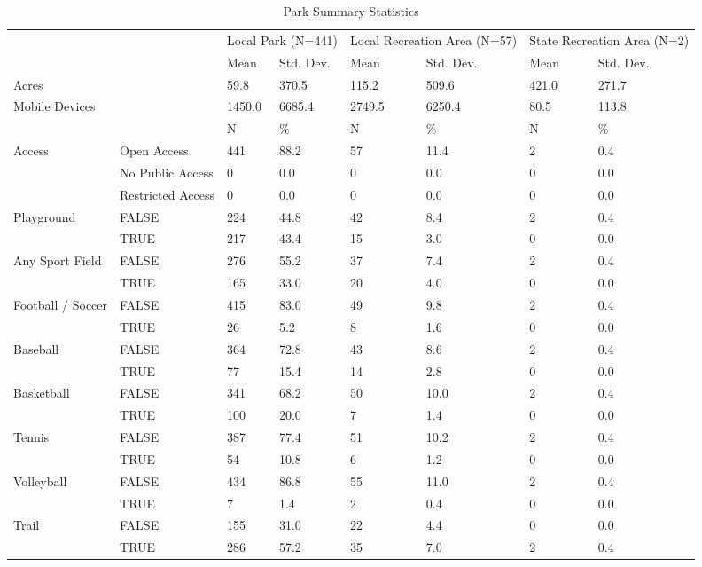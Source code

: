 \documentclass[]{elsarticle} %
\begin{document}
\begin{table}

\caption{\label{tab:park-attributes}Park Summary Statistics}
\centering
\begin{tabular}[t]{llllllll}
\toprule
\multicolumn{2}{c}{ } & \multicolumn{2}{c}{Local Park (N=441)} & \multicolumn{2}{c}{Local Recreation Area (N=57)} & \multicolumn{2}{c}{State Recreation Area (N=2)} \\
\cmidrule(l{3pt}r{3pt}){3-4} \cmidrule(l{3pt}r{3pt}){5-6} \cmidrule(l{3pt}r{3pt}){7-8}
  &    & Mean & Std. Dev. & Mean  & Std. Dev.  & Mean   & Std. Dev.  \\
\midrule
Acres &  & 59.8 & 370.5 & 115.2 & 509.6 & 421.0 & 271.7\\
Mobile Devices &  & 1450.0 & 6685.4 & 2749.5 & 6250.4 & 80.5 & 113.8\\
\midrule
 &  & N & \% & N & \% & N & \%\\
Access & Open Access & 441 & 88.2 & 57 & 11.4 & 2 & 0.4\\
 & No Public Access & 0 & 0.0 & 0 & 0.0 & 0 & 0.0\\
 & Restricted Access & 0 & 0.0 & 0 & 0.0 & 0 & 0.0\\
Playground & FALSE & 224 & 44.8 & 42 & 8.4 & 2 & 0.4\\
 & TRUE & 217 & 43.4 & 15 & 3.0 & 0 & 0.0\\
Any Sport Field & FALSE & 276 & 55.2 & 37 & 7.4 & 2 & 0.4\\
 & TRUE & 165 & 33.0 & 20 & 4.0 & 0 & 0.0\\
Football / Soccer & FALSE & 415 & 83.0 & 49 & 9.8 & 2 & 0.4\\
 & TRUE & 26 & 5.2 & 8 & 1.6 & 0 & 0.0\\
Baseball & FALSE & 364 & 72.8 & 43 & 8.6 & 2 & 0.4\\
 & TRUE & 77 & 15.4 & 14 & 2.8 & 0 & 0.0\\
Basketball & FALSE & 341 & 68.2 & 50 & 10.0 & 2 & 0.4\\
 & TRUE & 100 & 20.0 & 7 & 1.4 & 0 & 0.0\\
Tennis & FALSE & 387 & 77.4 & 51 & 10.2 & 2 & 0.4\\
 & TRUE & 54 & 10.8 & 6 & 1.2 & 0 & 0.0\\
Volleyball & FALSE & 434 & 86.8 & 55 & 11.0 & 2 & 0.4\\
 & TRUE & 7 & 1.4 & 2 & 0.4 & 0 & 0.0\\
Trail & FALSE & 155 & 31.0 & 22 & 4.4 & 0 & 0.0\\
 & TRUE & 286 & 57.2 & 35 & 7.0 & 2 & 0.4\\
\bottomrule
\end{tabular}
\end{table}
\end{document}
